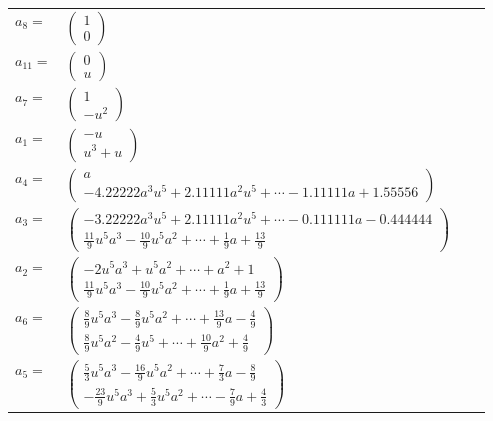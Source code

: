 \documentclass[1p]{elsarticle_modified}
\theoremstyle{definition}
\begin{document}
\begin{tabular}{m{7pt} m{180pt} m{7pt} m{180pt} }
\flushright $a_{8}=$&$\begin{pmatrix}1\\0\end{pmatrix}$ \\
\flushright $a_{11}=$&$\begin{pmatrix}0\\u\end{pmatrix}$ \\
\flushright $a_{7}=$&$\begin{pmatrix}1\\- u^2\end{pmatrix}$ \\
\flushright $a_{1}=$&$\begin{pmatrix}- u\\u^3+u\end{pmatrix}$ \\
\flushright $a_{4}=$&$\begin{pmatrix}a\\-4.22222 a^{3} u^{5}+2.11111 a^{2} u^{5}+\cdots-1.11111 a+1.55556\end{pmatrix}$ \\
\flushright $a_{3}=$&$\begin{pmatrix}-3.22222 a^{3} u^{5}+2.11111 a^{2} u^{5}+\cdots-0.111111 a-0.444444\\\frac{11}{9} u^5 a^3-\frac{10}{9} u^5 a^2+\cdots+\frac{1}{9} a+\frac{13}{9}\end{pmatrix}$ \\
\flushright $a_{2}=$&$\begin{pmatrix}-2 u^5 a^3+u^5 a^2+\cdots+a^2+1\\\frac{11}{9} u^5 a^3-\frac{10}{9} u^5 a^2+\cdots+\frac{1}{9} a+\frac{13}{9}\end{pmatrix}$ \\
\flushright $a_{6}=$&$\begin{pmatrix}\frac{8}{9} u^5 a^3-\frac{8}{9} u^5 a^2+\cdots+\frac{13}{9} a-\frac{4}{9}\\\frac{8}{9} u^5 a^2-\frac{4}{9} u^5+\cdots+\frac{10}{9} a^2+\frac{4}{9}\end{pmatrix}$ \\
\flushright $a_{5}=$&$\begin{pmatrix}\frac{5}{3} u^5 a^3-\frac{16}{9} u^5 a^2+\cdots+\frac{7}{3} a-\frac{8}{9}\\-\frac{23}{9} u^5 a^3+\frac{5}{3} u^5 a^2+\cdots-\frac{7}{9} a+\frac{4}{3}\end{pmatrix}$ \\

\end{tabular}
\end{document}

